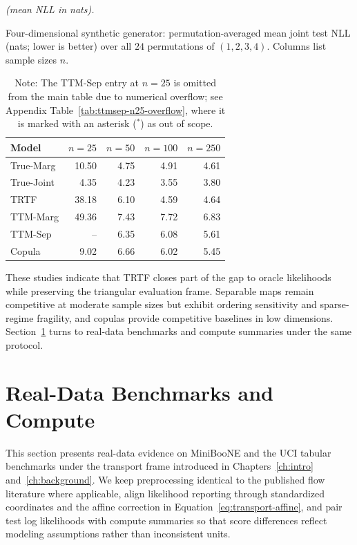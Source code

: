 \documentclass[11pt,a4paper,twoside]{book}\usepackage[]{graphicx}\usepackage[]{xcolor}
\begin{document}
\begin{table}[htbp]
  \centering
  \textit{(mean NLL in nats).}
  \caption{Four-dimensional synthetic generator: permutation-averaged mean joint test NLL (nats; lower is better) over all $24$ permutations of $(1,2,3,4)$. Columns list sample sizes $n$.}
  \label{tab:autoregressive-perm-avg}
  \begin{tabular}{lrrrr}
    \hline
    Model & $n=25$ & $n=50$ & $n=100$ & $n=250$ \\
    \hline
    True-Marg       & 10.50 & 4.75 & 4.91 & 4.61 \\
    True-Joint      & 4.35 & 4.23 & 3.55 & 3.80 \\
    TRTF              & 38.18 & 6.10 & 4.59 & 4.64 \\
    TTM-Marg          & 49.36 & 7.43 & 7.72 & 6.83 \\
    TTM-Sep           & -- & 6.35 & 6.08 & 5.61 \\
    Copula            & 9.02 & 6.66 & 6.02 & 5.45 \\
    \hline
  \end{tabular}
  \caption*{Note: The TTM-Sep entry at $n=25$ is omitted from the main table due to numerical overflow; see Appendix Table~\ref{tab:ttmsep-n25-overflow}, where it is marked with an asterisk ($^{\ast}$) as out of scope.}
\end{table}

These studies indicate that TRTF closes part of the gap to oracle likelihoods while preserving the triangular evaluation frame. Separable maps remain competitive at moderate sample sizes but exhibit ordering sensitivity and sparse-regime fragility, and copulas provide competitive baselines in low dimensions. Section~\ref{sec:realdata} turns to real-data benchmarks and compute summaries under the same protocol.

\section{Real-Data Benchmarks and Compute}\label{sec:realdata}

This section presents real-data evidence on MiniBooNE and the UCI tabular benchmarks under the transport frame introduced in Chapters~\ref{ch:intro} and~\ref{ch:background}. We keep preprocessing identical to the published flow literature where applicable, align likelihood reporting through standardized coordinates and the affine correction in Equation~\eqref{eq:transport-affine}, and pair test log likelihoods with compute summaries so that score differences reflect modeling assumptions rather than inconsistent units.
\end{document}
